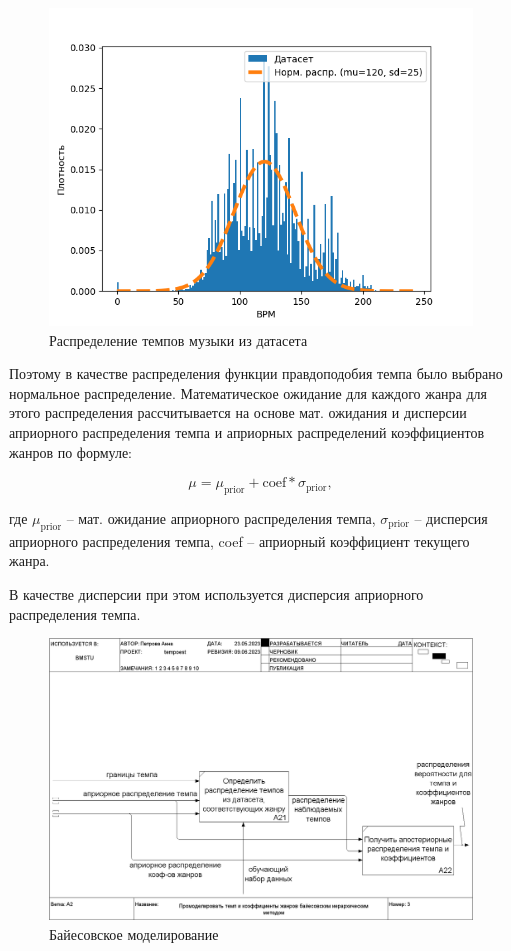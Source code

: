 \begin{figure}[h]
	\centering
	\includegraphics[scale=0.7]{../graphs/bpm_distribution.png}
	\caption{Распределение темпов музыки из датасета}
	\label{img:bpm_distribution}
\end{figure}

Поэтому в качестве распределения функции правдоподобия темпа было выбрано нормальное распределение. Математическое ожидание для каждого жанра для этого распределения рассчитывается на основе мат. ожидания и дисперсии априорного распределения темпа и априорных распределений коэффициентов жанров по формуле:

\begin{equation}
	\mu = \mu_{\text{prior}} + \text{coef} * \sigma_{\text{prior}},
\end{equation}

где $\mu_{\text{prior}}$ -- мат. ожидание априорного распределения темпа, $\sigma_{\text{prior}}$ -- дисперсия априорного распределения темпа, coef -- априорный коэффициент текущего жанра.

В качестве дисперсии при этом используется дисперсия априорного распределения темпа.

\begin{figure}[h]
	\centering
	\includegraphics[scale=0.25]{inc/img/tempo_idef/03_A2.png}
	\caption{Байесовское моделирование}
	\label{img:tempo_2}
\end{figure}

